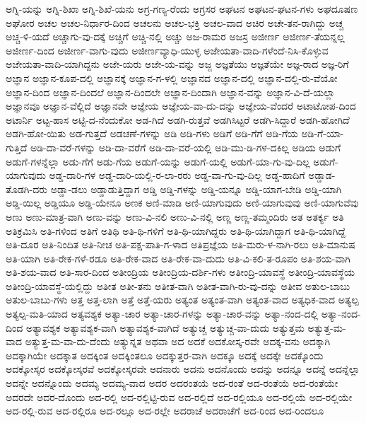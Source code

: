 ಅಗ್ನಿ-ಯನ್ನು
ಅಗ್ನಿ-ಶಿಖಾ
ಅಗ್ನಿ-ಶಿಖೆ-ಯನು
ಅಗ್ರ-ಗಣ್ಯ-ರೆಂದು
ಅಗ್ರಸರ
ಅಘಟನ
ಅಘಟನ-ಘಟನ-ಗಳು
ಅಘದೂಷಣ
ಅಘೋರ
ಅಚಲ
ಅಚಲ-ನಿರ್ಧಾರ-ದಿಂದ
ಅಚಲನು
ಅಚಲ-ಭಕ್ತಿ
ಅಚಲ-ವಾದ
ಅಚಿರ
ಅಚೇ-ತನ-ರಾಗಿದ್ದು
ಅಚ್ಚ
ಅಚ್ಚ-ಳಿ-ಯದೆ
ಅಚ್ಚಾಗು-ವು-ದಕ್ಕೆ
ಅಚ್ಚಿಗೆ
ಅಚ್ಚಿ-ನಲ್ಲಿ
ಅಚ್ಚು
ಅಜ-ರಾಮರ
ಅಜಸ್ರ
ಅಜೀರ್ಣ
ಅಜೀರ್ಣ-ತೆಯನ್ನಲ್ಲ
ಅಜೀರ್ಣ-ದಿಂದ
ಅಜೀರ್ಣ-ವಾಗು-ವುದು
ಅಜೀರ್ಣವ್ಯಾಧಿ-ಯುಳ್ಳ
ಅಜೇಯತಾ-ವಾದಿ-ಗಳೆಂದೆ-ನಿಸಿ-ಕೊಳ್ಳುವ
ಅಜೇಯತಾ-ವಾದಿ-ಯಾಗಿದ್ದನು
ಅಜೇ-ಯರು
ಅಜೇ-ಯ-ವನ್ನು
ಅಜ್ಜ
ಅಜ್ಞತೆಯು
ಅಜ್ಞತೆಯೇ
ಅಜ್ಞ-ರಾದ
ಅಜ್ಞ-ರಿಗೆ
ಅಜ್ಞಾನ
ಅಜ್ಞಾನ-ಕೂಪ-ದಲ್ಲಿ
ಅಜ್ಞಾನಕ್ಕೆ
ಅಜ್ಞಾನ-ಗ-ಳಲ್ಲಿ
ಅಜ್ಞಾನದ
ಅಜ್ಞಾನ-ದಲ್ಲಿ
ಅಜ್ಞಾನ-ದಲ್ಲಿ-ರು-ವೆಯೋ
ಅಜ್ಞಾನ-ದಿಂದ
ಅಜ್ಞಾನ-ದಿಂದಲೆ
ಅಜ್ಞಾನ-ದಿಂದಲೇ
ಅಜ್ಞಾನ-ದಿಂದಾಗಿ
ಅಜ್ಞಾನ-ವನ್ನು
ಅಜ್ಞಾನ-ವಿ-ದೆ-ಯಲ್ಲಾ
ಅಜ್ಞಾನವೂ
ಅಜ್ಞಾನ-ವೆಲ್ಲಿದೆ
ಅಜ್ಞಾನವೇ
ಅಜ್ಞೇಯ
ಅಜ್ಞೇಯ-ವಾ-ದು-ದನ್ನು
ಅಜ್ಞೇಯ-ವೆಂದರೆ
ಅಟಾಟೋಪ-ದಿಂದ
ಅಟಾರ್ನಿ
ಅಟ್ಟ-ಹಾಸ
ಅಟ್ಟಿ-ದ-ನೆಂದುಕೋ
ಅಡ-ಗಿದೆ
ಅಡಗಿ-ರುತ್ತವೆ
ಅಡಗಿಸಿಟ್ಟರೆ
ಅಡಗಿ-ಸಿದ್ದಾರೆ
ಅಡಗಿ-ಹೋಗಿದೆ
ಅಡಗಿ-ಹೋ-ಯಿತು
ಅಡ-ಗುತ್ತದೆ
ಅಡಚಣೆ-ಗಳನ್ನು
ಅಡಿ
ಅಡಿ-ಗಳು
ಅಡಿಗೆ
ಅಡಿ-ಗೆಗೆ
ಅಡಿ-ಗೆಯ
ಅಡಿ-ಗೆ-ಯಾ-ಗುತ್ತಿದೆ
ಅಡಿ-ದಾ-ವರೆ-ಗಳನ್ನು
ಅಡಿ-ದಾ-ವರೆಗೆ
ಅಡಿ-ದಾ-ವರೆ-ಯಲ್ಲಿ
ಅಡಿ-ಮು-ಡಿ-ಗಳ-ದಕಿಲ್ಲ
ಅಡಿಯ
ಅಡುಗೆ
ಅಡುಗೆ-ಗಳನ್ನೆಲ್ಲಾ
ಅಡು-ಗೆಗೆ
ಅಡು-ಗೆಯ
ಅಡುಗೆ-ಯನ್ನು
ಅಡುಗೆ-ಯಲ್ಲಿ
ಅಡುಗೆ-ಯಾ-ಗು-ವು-ದಿಲ್ಲ
ಅಡುಗೆ-ಯಾಗುವುದು
ಅಡ್ಡ-ದಾರಿ-ಗಳ
ಅಡ್ಡ-ದಾರಿ-ಯಲ್ಲಿ-ರ-ಲಾ-ರರು
ಅಡ್ಡ-ವಾ-ಗು-ವು-ದಿಲ್ಲ
ಅಡ್ಡ-ಹಾದಿಗೆ
ಅಡ್ಡಾಡ-ತೊಡಗಿ-ದರು
ಅಡ್ಡಾ-ಡಲು
ಅಡ್ಡಾಡುತ್ತಿದ್ದಾಗ
ಅಡ್ಡಿ
ಅಡ್ಡಿ-ಗಳನ್ನು
ಅಡ್ಡಿ-ಯನ್ನೂ
ಅಡ್ಡಿ-ಯಾಗ-ಬೇಡಿ
ಅಡ್ಡಿ-ಯಾಗಿ
ಅಡ್ಡಿ-ಯಿಲ್ಲ
ಅಡ್ಡಿಯೂ
ಅಡ್ಡಿ-ಯೇನೂ
ಅಣಕ
ಅಣಿ-ಮಾಡಿ
ಅಣಿ-ಯಾಗುವುದು
ಅಣಿ-ಯಾಗುವುವು
ಅಣಿ-ಯಾಗುವೆವು
ಅಣು
ಅಣು-ಮಾತ್ರ-ವಾಗಿ
ಅಣು-ವನ್ನು
ಅಣು-ವಿ-ನಲಿ
ಅಣು-ವಿ-ನಲ್ಲಿ
ಅಣ್ಣ
ಅಣ್ಣ-ತಮ್ಮಂದಿರು
ಅತ
ಅತರ್ಕ್ಯ
ಅತಿ
ಅತಿಕ್ರಮಿಸಿ
ಅತಿ-ಗಳಿಂದ
ಅತಿಗೆ
ಅತಿಥಿ
ಅತಿ-ಥಿ-ಗಳಿಗೆ
ಅತಿ-ಥಿ-ಯಾಗಿದ್ದರು
ಅತಿ-ಥಿ-ಯಾಗಿದ್ದಾಗ
ಅತಿ-ಥಿ-ಯಾಗಿದ್ದೆ
ಅತಿ-ದೂರ
ಅತಿ-ನಿಂದಿತ
ಅತಿ-ನೀಚ
ಅತಿ-ಪಕ್ಷ-ಪಾತಿ-ಗ-ಳಾದ
ಅತಿಪ್ರಜ್ಞೆಯ
ಅತಿ-ಮರು-ಳ-ನಾಗಿ-ರಲು
ಅತಿ-ಮಾನುಷ
ಅತಿ-ಯಾಗಿ
ಅತಿ-ರೇಕ-ಗಳೆ-ರಡೂ
ಅತಿ-ರೇಕ-ವಾದ
ಅತಿ-ರೇಕ-ವಾ-ದುದು
ಅತಿ-ವಿ-ಕಲಿ-ತ-ರೂಪಂ
ಅತಿ-ಶಯ-ವಾಗಿ
ಅತಿ-ಶಯ-ವಾದ
ಅತಿ-ಸಾರ-ದಿಂದ
ಅತೀಂದ್ರಿಯ
ಅತೀಂದ್ರಿಯ-ದರ್ಶಿ-ಗಳು
ಅತೀಂದ್ರಿ-ಯಾವಸ್ಥೆ
ಅತೀಂದ್ರಿ-ಯಾವಸ್ಥೆಯ
ಅತೀಂದ್ರಿ-ಯಾವಸ್ಥೆ-ಯಲ್ಲಿದ್ದು
ಅತೀತ
ಅತೀ-ತನು
ಅತೀತ-ವಾಗಿ
ಅತೀತ-ವಾಗಿ-ರು-ವು-ದನ್ನು
ಅತೀವ
ಅತುಲ-ಬಾಬು
ಅತುಲ-ಬಾಬು-ಗಳು
ಅತ್ತ
ಅತ್ತ-ಲಾಗಿ
ಅತ್ತೆ
ಅತ್ತೆ-ಯರು
ಅತ್ಯಂತ
ಅತ್ಯಂತ-ವಾಗಿ
ಅತ್ಯಂತ-ವಾದ
ಅತ್ಯಧಿಕ-ವಾದ
ಅತ್ಯಲ್ಪ
ಅತ್ಯಲ್ಪ-ಮತಿ-ಯಾದ
ಅತ್ಯವಶ್ಯಕ
ಅತ್ಯಾ-ಚಾರ
ಅತ್ಯಾ-ಚಾರ-ಗಳನ್ನು
ಅತ್ಯಾ-ಚಾರ-ವನ್ನು
ಅತ್ಯಾ-ನಂದ-ದಲ್ಲಿ
ಅತ್ಯಾ-ನಂದ-ದಿಂದ
ಅತ್ಯಾವಶ್ಯಕ
ಅತ್ಯಾವಶ್ಯಕ-ವಾಗಿ
ಅತ್ಯಾವಶ್ಯಕ-ವಾಗಿದೆ
ಅತ್ಯುಚ್ಚ
ಅತ್ಯುಚ್ಚ-ವಾ-ದುದು
ಅತ್ಯುತ್ತಮ
ಅತ್ಯುತ್ತ-ಮ-ವಾದ
ಅತ್ಯುತ್ತ-ಮ-ವಾ-ದು-ದೆಂದು
ಅತ್ಯುನ್ನತ
ಅಥವಾ
ಅದ
ಅದಕೆ
ಅದಕೋಸ್ಕ-ರವೇ
ಅದಕ್ಕ-ವನು
ಅದಕ್ಕಾಗಿ
ಅದಕ್ಕಾಗಿಯೇ
ಅದಕ್ಕಾತ
ಅದಕ್ಕಿಂತ
ಅದಕ್ಕಿಂತಲೂ
ಅದಕ್ಕುತ್ತರ-ವಾಗಿ
ಅದಕ್ಕೂ
ಅದಕ್ಕೆ
ಅದಕ್ಕೇ
ಅದಕ್ಕೊಂದು
ಅದಕ್ಕೋಸ್ಕರ
ಅದಕ್ಕೋಸ್ಕರವೆ
ಅದಕ್ಕೋಸ್ಕರವೇ
ಅದನಾರು
ಅದನು
ಅದನೊಂದು
ಅದನ್ನು
ಅದನ್ನೂ
ಅದನ್ನೆ
ಅದನ್ನೆಲ್ಲಾ
ಅದನ್ನೇ
ಅದನ್ನೊಂದು
ಅದಮ್ಯ
ಅದಮ್ಯ-ವಾದ
ಅದರ
ಅದರಂತಯೆ
ಅದ-ರಂತೆ
ಅದ-ರಂತೆಯೆ
ಅದ-ರಂತೆಯೇ
ಅದರದೇ
ಅದರ-ದೊಂದು
ಅದ-ರಲ್ಲಿ
ಅದ-ರಲ್ಲಿಟ್ಟಿ-ರುವ
ಅದ-ರಲ್ಲಿದೆ
ಅದ-ರಲ್ಲಿಯೂ
ಅದ-ರಲ್ಲಿಯೆ
ಅದ-ರಲ್ಲಿಯೇ
ಅದ-ರಲ್ಲಿ-ರುವ
ಅದ-ರಲ್ಲಿರೂ
ಅದ-ರಲ್ಲೂ
ಅದ-ರಲ್ಲೇ
ಅದರಾಚೆ
ಅದರಾಚೆಗೆ
ಅದ-ರಿಂದ
ಅದ-ರಿಂದಲೂ
